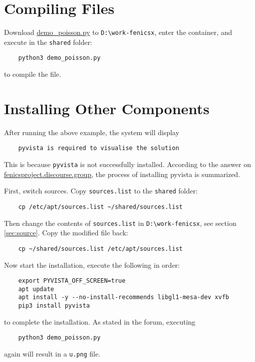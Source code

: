 \documentclass{report}
\begin{document}
\section{Compiling Files}

Download \href{https://docs.fenicsproject.org/dolfinx/main/python/_downloads/b94ac7be61dc3726ca331afd20f195d2/demo_poisson.py}{demo\_poisson.py} to \texttt{D:\textbackslash work-fenicsx}, enter the container, and execute in the \texttt{shared} folder:
\begin{lstlisting}
	python3 demo_poisson.py
\end{lstlisting}
to compile the file.

\section{Installing Other Components}

After running the above example, the system will display
\begin{lstlisting}
	pyvista is required to visualise the solution
\end{lstlisting}
This is because \texttt{pyvista} is not successfully installed. According to the answer on \href{https://fenicsproject.discourse.group/t/how-to-use-pyvista-in-docker-for-windows-10-user/6921}{fenicsproject.discourse.group}, the process of installing pyvista is summarized.

First, switch sources. Copy \texttt{sources.list} to the \texttt{shared} folder:
\begin{lstlisting}
	cp /etc/apt/sources.list ~/shared/sources.list
\end{lstlisting}
Then change the contents of \texttt{sources.list} in \texttt{D:\textbackslash work-fenicsx}, see section \ref{sec:source}. Copy the modified file back:
\begin{lstlisting}
	cp ~/shared/sources.list /etc/apt/sources.list
\end{lstlisting}

Now start the installation, execute the following in order:
\begin{lstlisting}
	export PYVISTA_OFF_SCREEN=true
	apt update
	apt install -y --no-install-recommends libgl1-mesa-dev xvfb
	pip3 install pyvista
\end{lstlisting}
to complete the installation. As stated in the forum, executing
\begin{lstlisting}
	python3 demo_poisson.py
\end{lstlisting}
again will result in a \texttt{u.png} file.
\end{document}

